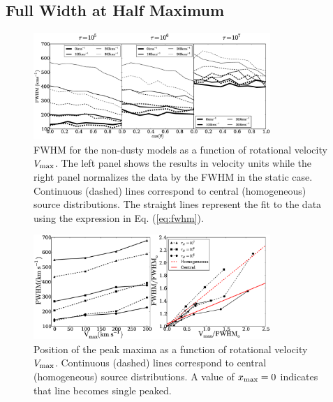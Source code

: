 \documentclass{emulateapj}
\begin{document}
\subsection{Full Width at Half Maximum}
\label{sec:widthpeak}


\begin{figure}
\begin{center}
  \includegraphics[width=0.8\textwidth]{widths.eps}
\end{center}
  \caption{FWHM for the non-dusty models as a function of
    rotational velocity $V_{\rm max}$. The left panel shows the
    results in velocity units while the right panel normalizes
    the data by the FWHM in the static case. 
    Continuous (dashed) lines  correspond to central (homogeneous)
    source distributions. The straight lines represent the fit to
    the data using the expression in Eq. (\ref{eq:fwhm}).
    \label{fig:widthvsmu}} 
\end{figure}

\begin{figure}
\begin{center}
  \includegraphics[width=0.8\textwidth]{f2.eps}
\end{center}
\caption{Position of the peak maxima as a function of rotational
  velocity $V_{\rm max}$. Continuous (dashed) lines correspond to
  central (homogeneous) source distributions. A value of $x_{\rm
    max}=0$ indicates that line becomes single
  peaked. \label{fig:widthsvsvelocity}}  
\end{figure}
\end{document}

